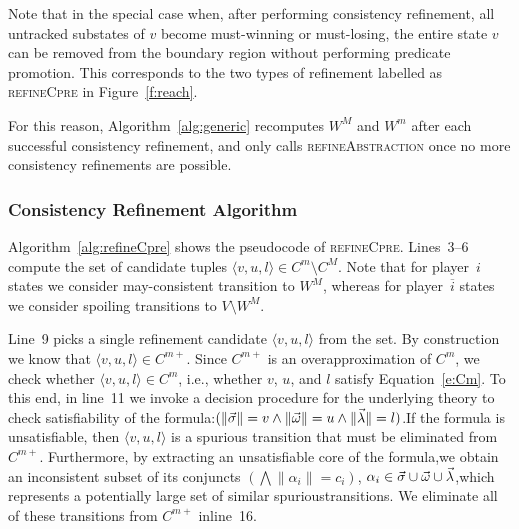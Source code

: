 Note that in the special case when, after performing consistency refinement, all untracked substates of $v$ become must-winning or must-losing, the entire state $v$ can be removed from the boundary region without performing predicate promotion.  This corresponds to the two types of refinement labelled as \textsc{refineCpre} in Figure~\ref{f:reach}.  

For this reason, Algorithm~\ref{alg:generic} recomputes $W^M$ and $W^m$ after each successful consistency refinement, and only calls \textsc{refineAbstraction} once no more consistency refinements are possible.

\subsubsection{Consistency Refinement Algorithm}

Algorithm~\ref{alg:refineCpre} shows the pseudocode of \textsc{refineCpre}.  Lines~3--6 compute the set of candidate tuples $\langle v, u, l\rangle\in C^m\setminus C^M$.  Note that for player~$i$ states we consider may-consistent transition to $W^M$, whereas for player~$\overline{i}$ states we consider spoiling transitions to $V\setminus W^M$.

Line~9 picks a single refinement candidate $\langle v,u,l \rangle$ from the set.  By construction we know that $\langle v,u,l\rangle\in C^{m+}$.  Since $C^{m+}$ is an overapproximation of $C^m$, we check whether $\langle v,u,l\rangle\in C^m$, i.e., whether $v$, $u$, and $l$ satisfy Equation~\ref{e:Cm}.  To this end, in line~11 we invoke a decision procedure for the underlying theory to check satisfiability of the formula:$(\|\vec{\sigma}\|=v \land \|\vec{\omega}\|=u \land \|\vec{\lambda}\|=l)$.If the formula is unsatisfiable, then $\langle v,u,l\rangle$ is a spurious transition that must be eliminated from $C^{m+}$.  Furthermore, by extracting an unsatisfiable core of the formula,we obtain an inconsistent subset of its conjuncts $(\bigwedge\|\alpha_i\|=c_i)$, $\alpha_i\in\vec{\sigma}\cup\vec{\omega}\cup\vec{\lambda}$,which represents a potentially large set of similar spurioustransitions.  We eliminate all of these transitions from $C^{m+}$ inline~16.

